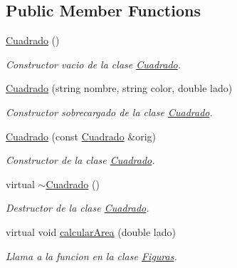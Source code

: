 \subsection*{Public Member Functions}
\begin{DoxyCompactItemize}
\item 
\hypertarget{class_cuadrado_ad28d9dddc29e1987ec620b07b0a4acc9}{}\label{class_cuadrado_ad28d9dddc29e1987ec620b07b0a4acc9} 
\hyperlink{class_cuadrado_ad28d9dddc29e1987ec620b07b0a4acc9}{Cuadrado} ()
\begin{DoxyCompactList}\small\item\em Constructor vacio de la clase \hyperlink{class_cuadrado}{Cuadrado}. \end{DoxyCompactList}\item 
\hyperlink{class_cuadrado_afb489ccf7f7b4e2837d080bee5f6656a}{Cuadrado} (string nombre, string color, double lado)
\begin{DoxyCompactList}\small\item\em Constructor sobrecargado de la clase \hyperlink{class_cuadrado}{Cuadrado}. \end{DoxyCompactList}\item 
\hyperlink{class_cuadrado_a51f15bc1eb52008d394ac1191e257aeb}{Cuadrado} (const \hyperlink{class_cuadrado}{Cuadrado} \&orig)
\begin{DoxyCompactList}\small\item\em Constructor de la clase \hyperlink{class_cuadrado}{Cuadrado}. \end{DoxyCompactList}\item 
\hypertarget{class_cuadrado_a9f5bf29c9b8368ad45a4a3c12f9fd7c2}{}\label{class_cuadrado_a9f5bf29c9b8368ad45a4a3c12f9fd7c2} 
virtual \hyperlink{class_cuadrado_a9f5bf29c9b8368ad45a4a3c12f9fd7c2}{$\sim$\+Cuadrado} ()
\begin{DoxyCompactList}\small\item\em Destructor de la clase \hyperlink{class_cuadrado}{Cuadrado}. \end{DoxyCompactList}\item 
\hypertarget{class_cuadrado_a21bd92e4d2fa822d898a1a70100012ec}{}\label{class_cuadrado_a21bd92e4d2fa822d898a1a70100012ec} 
virtual void \hyperlink{class_cuadrado_a21bd92e4d2fa822d898a1a70100012ec}{calcular\+Area} (double lado)
\begin{DoxyCompactList}\small\item\em Llama a la funcion en la clase \hyperlink{class_figuras}{Figuras}. \end{DoxyCompactList}\item 

\end{DoxyCompactItemize}
